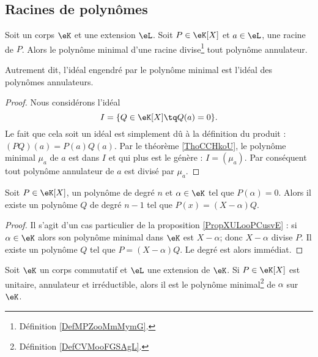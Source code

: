 \subsection{Racines de polynômes}

\begin{proposition}\label{PropXULooPCusvE}
    Soit un corps \( \eK\) et une extension \( \eL\). Soit \( P\in \eK[X]\) et  \( a\in \eL\), une racine de \( P\). Alors le polynôme minimal d'une racine divise\footnote{Définition \ref{DefMPZooMmMymG}.} tout polynôme annulateur.

    Autrement dit, l'idéal engendré par le polynôme minimal est l'idéal des polynômes annulateurs.
\end{proposition}

\begin{proof}
    Nous considérons l'idéal
    \begin{equation}
        I=\{ Q\in \eK[X]\tq Q(a)=0 \}.
    \end{equation}
    Le fait que cela soit un idéal est simplement dû à la définition du produit : \( (PQ)(a)=P(a)Q(a)\). Par le théorème \ref{ThoCCHkoU}, le polynôme minimal \( \mu_a\) de \( a\) est dans \( I\) et qui plus est le génère : \( I=(\mu_a)\). Par conséquent tout polynôme annulateur de \( a\) est divisé par \( \mu_a\).
\end{proof}

\begin{corollary}   \label{CorDIYooEtmztc}
    Soit \( P\in \eK[X]\), un polynôme de degré \( n\) et \( \alpha\in \eK\) tel que \( P(\alpha)=0\). Alors il existe un polynôme \( Q\) de degré \( n-1\) tel que \( P(x)=(X-\alpha)Q\).
\end{corollary}

\begin{proof}
    Il s'agit d'un cas particulier de la proposition \ref{PropXULooPCusvE} : si \( \alpha\in \eK\) alors son polynôme minimal dans \( \eK\) est \( X-\alpha\); donc \( X-\alpha\) divise \( P\). Il existe un polynôme \( Q\) tel que \( P=(X-\alpha)Q\). Le degré est alors immédiat.
\end{proof}

\begin{corollary}   \label{CorKZIooLPUjaf}
    Soit \( \eK\) un corps commutatif et \( \eL\) une extension de \( \eK\). Si \( P\in\eK[X]\) est unitaire, annulateur et irréductible, alors il est le polynôme minimal\footnote{Définition \ref{DefCVMooFGSAgL}.} de \( \alpha\) sur \( \eK\).
\end{corollary}

